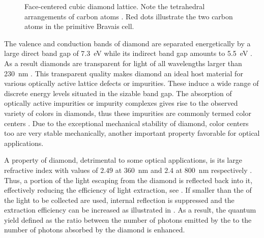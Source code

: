   \begin{figure}[!htb]
		\centering
		\caption[Face-centered cubic diamond lattice]{Face-centered cubic diamond lattice. Note the tetrahedral arrangements of carbon atoms \cite{demtroder2000experimentalphysik}. Red dots illustrate the two carbon atoms in the primitive Bravais cell.}
		\label{fig::diamond_lattice}
	\end{figure}

  The valence and conduction bands of diamond are separated energetically by a large direct band gap of \SI{7.3}{\eV} while its indirect band gap amounts to \SI{5.5}{\eV} \cite{Clark1964, Saslow1966}. As a result diamonds are transparent for light of all wavelengths larger than \SI{230}{\nm} \cite{Mildren2008}. This transparent quality makes diamond an ideal host material for various optically active lattice defects or impurities. These induce a wide range of discrete energy levels situated in the sizable band gap. The absorption of optically active impurities or impurity complexes gives rise to the observed variety of colors in diamonds, thus these impurities are commonly termed color centers \cite{Neu2012}. Due to the exceptional mechanical stability of diamond, color centers too are very stable mechanically, another important property favorable for optical applications.

  A property of diamond, detrimental to some optical applications, is its large refractive index with values of $2.49$ at \SI{360}{\nm} and $2.4$ at \SI{800}{\nm} respectively \cite{Zaitsev2001}. Thus, a portion of the light escaping from the diamond is reflected back into it, effectively reducing the efficiency of light extraction, see . If \nds smaller than the \wl of the light to be collected are used, internal reflection is suppressed and the extraction efficiency can be increased as illustrated in  \cite{Beveratos2001}. As a result, the quantum yield defined as the ratio between the number of photons emitted by the \siv to the number of photons absorbed by the diamond is enhanced.

